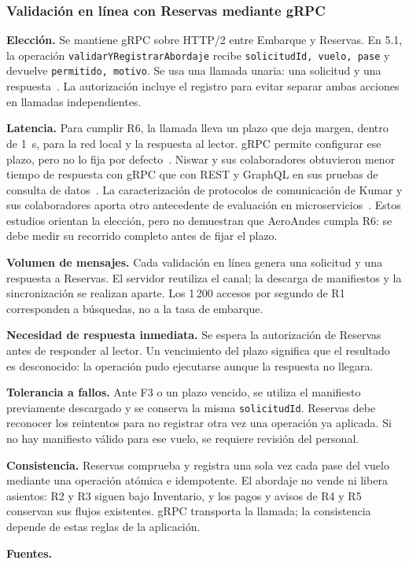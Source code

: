 \documentclass[11pt,a4paper]{article}
\newcommand{\decision}[8]{\subsubsection*{#1}%
  \textbf{Elección.} #2\par
  \textbf{Latencia.} #3\par
  \textbf{Volumen de mensajes.} #4\par
  \textbf{Necesidad de respuesta inmediata.} #5\par
  \textbf{Tolerancia a fallos.} #6\par
  \textbf{Consistencia.} #7\par
  \textbf{Fuentes.} #8\par}
\begin{document}
\decision{Validación en línea con Reservas mediante gRPC}
 {Se mantiene gRPC sobre HTTP/2 entre Embarque y Reservas. En 5.1, la operación \texttt{validarYRegistrarAbordaje} recibe \texttt{solicitudId, vuelo, pase} y devuelve \texttt{permitido, motivo}. Se usa una llamada unaria: una solicitud y una respuesta~\cite{grpcConcepts,grpcAbout}. La autorización incluye el registro para evitar separar ambas acciones en llamadas independientes.}
 {Para cumplir R6, la llamada lleva un plazo que deja margen, dentro de 1~s, para la red local y la respuesta al lector. gRPC permite configurar ese plazo, pero no lo fija por defecto~\cite{grpcDeadlines}. Niswar y sus colaboradores obtuvieron menor tiempo de respuesta con gRPC que con REST y GraphQL en sus pruebas de consulta de datos~\cite{niswar2024grpc}. La caracterización de protocolos de comunicación de Kumar y sus colaboradores aporta otro antecedente de evaluación en microservicios~\cite{kumar2021protocols}. Estos estudios orientan la elección, pero no demuestran que AeroAndes cumpla R6: se debe medir su recorrido completo antes de fijar el plazo.}
 {Cada validación en línea genera una solicitud y una respuesta a Reservas. El servidor reutiliza el canal; la descarga de manifiestos y la sincronización se realizan aparte. Los 1\,200 accesos por segundo de R1 corresponden a búsquedas, no a la tasa de embarque.}
 {Se espera la autorización de Reservas antes de responder al lector. Un vencimiento del plazo significa que el resultado es desconocido: la operación pudo ejecutarse aunque la respuesta no llegara.}
 {Ante F3 o un plazo vencido, se utiliza el manifiesto previamente descargado y se conserva la misma \texttt{solicitudId}. Reservas debe reconocer los reintentos para no registrar otra vez una operación ya aplicada. Si no hay manifiesto válido para ese vuelo, se requiere revisión del personal.}
 {Reservas comprueba y registra una sola vez cada pase del vuelo mediante una operación atómica e idempotente. El abordaje no vende ni libera asientos: R2 y R3 siguen bajo Inventario, y los pagos y avisos de R4 y R5 conservan sus flujos existentes. gRPC transporta la llamada; la consistencia depende de estas reglas de la aplicación.}
 {\cite{grpcConcepts,grpcAbout,grpcDeadlines,niswar2024grpc,kumar2021protocols}}
\end{document}
